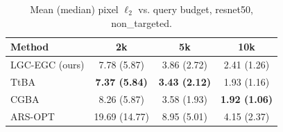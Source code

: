 \begin{table}[t]
\centering\footnotesize
\caption{Mean (median) pixel $\ell_2$ vs. query budget, resnet50, non\_targeted.}
\begin{tabular}{lccc}
\toprule
Method & 2k & 5k & 10k \\
\midrule
LGC-EGC (ours) & 7.78 (5.87) & 3.86 (2.72) & 2.41 (1.26) \\
TtBA & \textbf{7.37 (5.84)} & \textbf{3.43 (2.12)} & 1.93 (1.16) \\
CGBA & 8.26 (5.87) & 3.58 (1.93) & \textbf{1.92 (1.06)} \\
ARS-OPT & 19.69 (14.77) & 8.95 (5.01) & 4.15 (2.37) \\
\bottomrule
\end{tabular}
\end{table}
